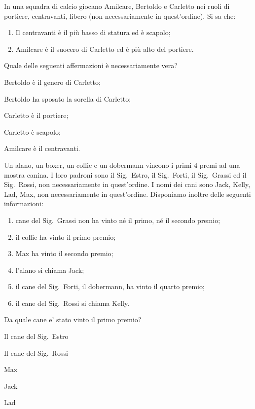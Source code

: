 \begin{esercizio}
\label{ese:1.30}
In una squadra di calcio giocano Amilcare, Bertoldo e Carletto nei ruoli di portiere, centravanti, libero (non necessariamente in quest'ordine). Si sa che:
\begin{enumerate}
\item Il centravanti è il più basso di statura ed è scapolo;
\item Amilcare è il suocero di Carletto ed è più alto del portiere.
\end{enumerate}
Quale delle seguenti affermazioni è necessariamente vera?
\begin{multicols}{2}
\begin{enumeratea}
\item Bertoldo è il genero di Carletto;
\item Bertoldo ha sposato la sorella di Carletto;
\item Carletto è il portiere;
\item Carletto è scapolo;
\item Amilcare è il centravanti.
\end{enumeratea}
\end{multicols}
\end{esercizio}

\begin{esercizio}
\label{ese:1.31}
Un alano, un boxer, un collie e un dobermann vincono i primi 4 premi ad una mostra canina. I loro padroni sono il Sig.~Estro, il Sig.~Forti, il Sig.~Grassi ed il Sig.~Rossi, non necessariamente in quest'ordine. I nomi dei cani sono Jack, Kelly, Lad, Max, non necessariamente in quest'ordine. Disponiamo inoltre delle seguenti informazioni:
\begin{enumerate}
\item cane del Sig.~Grassi non ha vinto né il primo, né il secondo premio;
\item il collie ha vinto il primo premio;
\item Max ha vinto il secondo premio;
\item l'alano si chiama Jack;
\item il cane del Sig.~Forti, il dobermann, ha vinto il quarto premio;
\item il cane del Sig.~Rossi si chiama Kelly.
\end{enumerate}
Da quale cane e' stato vinto il primo premio?
\begin{multicols}{2}
\begin{enumeratea}
\item Il cane del Sig.~Estro
\item Il cane del Sig.~Rossi
\item Max
\item Jack
\item Lad
\end{enumeratea}
\end{multicols}
\end{esercizio}

